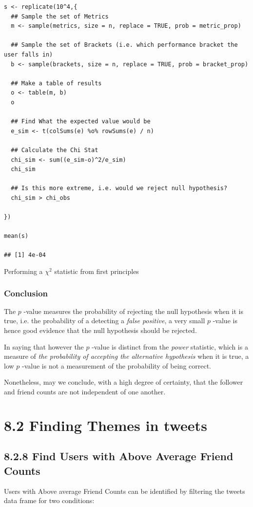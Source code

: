 \documentclass[11pt]{article}
\begin{document}
\begin{enumerate}
\begin{enumerate}
\begin{listing}[htbp]
\begin{verbatim}
s <- replicate(10^4,{
  ## Sample the set of Metrics
  m <- sample(metrics, size = n, replace = TRUE, prob = metric_prop)

  ## Sample the set of Brackets (i.e. which performance bracket the user falls in)
  b <- sample(brackets, size = n, replace = TRUE, prob = bracket_prop)

  ## Make a table of results
  o <- table(m, b)
  o

  ## Find What the expected value would be
  e_sim <- t(colSums(e) %o% rowSums(e) / n)

  ## Calculate the Chi Stat
  chi_sim <- sum((e_sim-o)^2/e_sim)
  chi_sim

  ## Is this more extreme, i.e. would we reject null hypothesis?
  chi_sim > chi_obs

})

mean(s)

## [1] 4e-04
\end{verbatim}
\caption{\label{org0449342}Performing a \(\chi^{2}\) statistic from first principles}
\end{listing}
\end{enumerate}
\end{enumerate}
\subsubsection{Conclusion}
\label{sec:orgc133b1f}
The \(p\) -value measures the probability of rejecting the null hypothesis when it
is true, i.e. the probability of a detecting a \emph{false positive}, a very small
\(p\) -value is hence good evidence that the null hypothesis should be rejected.

In saying that however the \(p\) -value is distinct from the \emph{power} statistic,
which is a measure of \emph{the probability of accepting the alternative hypothesis}
when it is true, a low \(p\) -value is not a measurement of the probability of
being correct.

Nonetheless, may we conclude, with a high degree of certainty, that the follower and
friend counts are not independent of one another.
\section{8.2 Finding Themes in tweets}
\label{sec:org310ab0f}
\subsection{8.2.8 Find Users with Above Average Friend Counts}
\label{sec:org412a0f5}
Users with Above average Friend Counts can be identified by filtering the tweets
data frame for two conditions:
\end{document}
